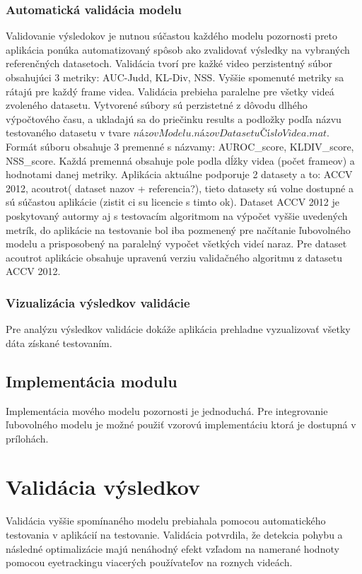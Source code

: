 \subsubsection{Automatická validácia modelu}
Validovanie výsledokov je nutnou súčastou každého modelu pozornosti preto aplikácia ponúka automatizovaný spôsob ako zvalidovať výsledky na vybraných referenčných datasetoch.
Validácia tvorí pre kažké video perzistentný súbor obsahujúci 3 metriky: AUC-Judd, KL-Div, NSS.
Vyššie spomenuté metriky sa rátajú pre každý frame videa.
Validácia prebieha paralelne pre všetky videá zvoleného datasetu.
Vytvorené súbory sú perzistetné z dôvodu dlhého výpočtového času, a ukladajú sa do priečinku results a podložky podľa názvu testovaného datasetu v tvare \begin{math}názovModelu.názovDatasetuČísloVidea.mat\end{math}.
Formát súboru obsahuje 3 premenné s názvamy: AUROC\_score, KLDIV\_score, NSS\_score.
Každá premenná obsahuje pole podla dĺžky videa (počet frameov) a hodnotami danej metriky.
Aplikácia aktuálne podporuje 2 datasety a to: ACCV 2012\cite{accv}, acoutrot( dataset nazov + referencia?), tieto datasety sú volne dostupné a sú súčastou aplikácie (zistit ci su licencie s timto ok).
Dataset ACCV 2012\cite{accv} je poskytovaný autormy aj s testovacím algoritmom na výpočet vyššie uvedených metrík, do aplikácie na testovanie bol iba pozmenený pre načítanie ľubovolného modelu a prisposobený na paralelný vypočet všetkých videí naraz.
Pre dataset acoutrot aplikácie obsahuje upravenú verziu validačného algoritmu z datasetu ACCV 2012.

\subsubsection{Vizualizácia výsledkov validácie}
Pre analýzu výsledkov validácie dokáže aplikácia prehladne vyzualizovať všetky dáta získané testovaním.

\subsection{Implementácia modulu}
Implementácia mového modelu pozornosti je jednoduchá.
Pre integrovanie ľubovolného modelu je možné použiť vzorovú implementáciu ktorá je dostupná v prílohách.

\section{Validácia výsledkov}
Validácia vyššie spomínaného modelu prebiahala pomocou automatického testovania v aplikácií na testovanie.
Validácia potvrdila, že detekcia pohybu a následné optimalizácie majú nenáhodný efekt vzľadom na namerané hodnoty pomocou eyetrackingu viacerých používateľov na roznych videách.

